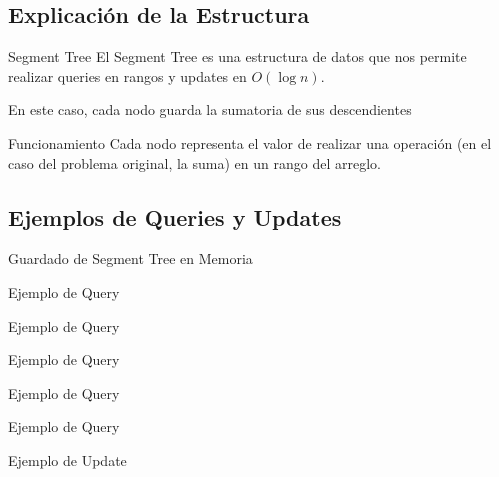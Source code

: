 \documentclass{beamer}
\begin{document}
\subsection{Explicación de la Estructura}
\begin{frame}{Segment Tree}
El Segment Tree es una estructura de datos que nos permite realizar queries en rangos y updates en $O(\log n)$.
\pause



{\tiny En este caso, cada nodo guarda la sumatoria de sus descendientes}

\end{frame}

\begin{frame}{Funcionamiento}
Cada nodo representa el valor de realizar una operación (en el caso del problema original, la suma) en un rango del arreglo.


\end{frame}

\subsection{Ejemplos de Queries y Updates}

\begin{frame}{Guardado de Segment Tree en Memoria}

\end{frame}

\begin{frame}{Ejemplo de Query}

\end{frame}

\begin{frame}{Ejemplo de Query}

\end{frame}

\begin{frame}{Ejemplo de Query}

\end{frame}

\begin{frame}{Ejemplo de Query}

\end{frame}

\begin{frame}{Ejemplo de Query}

\end{frame}

\begin{frame}{Ejemplo de Update}

\end{frame}
\end{document}
